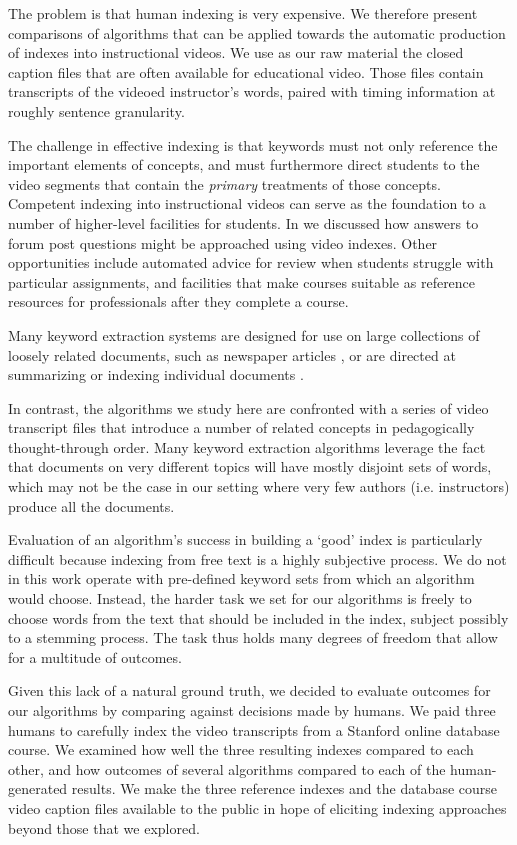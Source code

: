 The problem is that human indexing is very expensive. We therefore
present comparisons of algorithms that can be applied towards the
automatic production of indexes into instructional videos. We use as
our raw material the closed caption files that are often available for
educational video. Those files contain transcripts of the videoed
instructor's words, paired with timing information at roughly sentence
granularity.

The challenge in effective indexing is that keywords must not only
reference the important elements of concepts, and must furthermore
direct students to the video segments that contain the {\em primary}
treatments of those concepts. Competent indexing into instructional
videos can serve as the foundation to a number of higher-level
facilities for students. In \cite{agrawal2015} we discussed how
answers to forum post questions might be approached using video
indexes. Other opportunities include automated advice for review when
students struggle with particular assignments, and facilities that
make courses suitable as reference resources for professionals after
they complete a course.

Many keyword extraction systems are designed for use on large
collections of loosely related documents, such as newspaper articles
\cite{Salton1975}, or are directed at summarizing or indexing
individual documents \cite{ohsawa1998}.

In contrast, the algorithms we study here are confronted with a series
of video transcript files that introduce a number of related concepts
in pedagogically thought-through order. Many keyword extraction
algorithms leverage the fact that documents on very different topics
will have mostly disjoint sets of words, which may not be the case in
our setting where very few authors (i.e. instructors) produce all the
documents.

Evaluation of an algorithm's success in building a `good' index is
particularly difficult because indexing from free text is a highly
subjective process. We do not in this work operate with pre-defined
keyword sets from which an algorithm would choose. Instead, the harder
task we set for our algorithms is freely to choose words from the text
that should be included in the index, subject possibly to a stemming
process. The task thus holds many degrees of freedom that allow for a
multitude of outcomes.

Given this lack of a natural ground truth, we decided to evaluate
outcomes for our algorithms by comparing against decisions made by
humans. We paid three humans to carefully index the video transcripts
from a Stanford online database course.  We examined how well the
three resulting indexes compared to each other, and how outcomes of
several algorithms compared to each of the human-generated results. We
make the three reference indexes and the database course video caption
files available to the public in hope of eliciting indexing approaches
beyond those that we explored.

